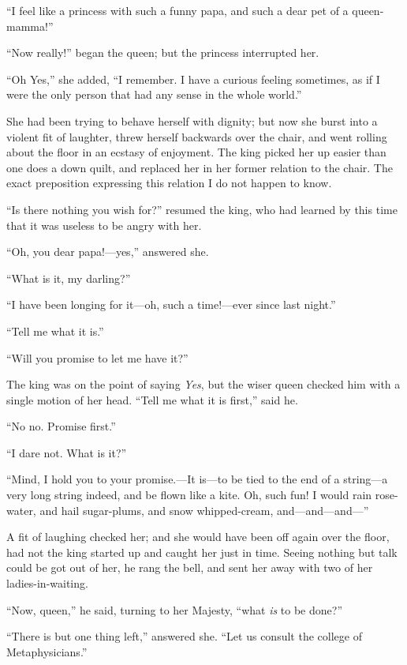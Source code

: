 \documentclass[12pt]{memoir}
\begin{document}
``I feel like a princess with such a funny papa, and such a dear pet
of a queen-mamma!''

``Now really!'' began the queen; but the princess interrupted her.

``Oh Yes,'' she added, ``I remember.  I have a curious feeling
sometimes, as if I were the only person that had any sense in the
whole world.''

She had been trying to behave herself with dignity; but now she burst
into a violent fit of laughter, threw herself backwards over the
chair, and went rolling about the floor in an ecstasy of enjoyment.
The king picked her up easier than one does a down quilt, and replaced
her in her former relation to the chair.  The exact preposition
expressing this relation I do not happen to know.

``Is there nothing you wish for?'' resumed the king, who had learned
by this time that it was useless to be angry with her.

``Oh, you dear papa!---yes,'' answered she.

``What is it, my darling?''

``I have been longing for it---oh, such a time!---ever since last
night.''

``Tell me what it is.''

``Will you promise to let me have it?''

The king was on the point of saying \emph{Yes}, but the wiser queen
checked him with a single motion of her head.  ``Tell me what it is
first,'' said he.

``No no.  Promise first.''

``I dare not.  What is it?''

``Mind, I hold you to your promise.---It is---to be tied to the end of
a string---a very long string indeed, and be flown like a kite.  Oh,
such fun!  I would rain rose-water, and hail sugar-plums, and snow
whipped-cream, and---and---and---''

A fit of laughing checked her; and she would have been off again over
the floor, had not the king started up and caught her just in time.
Seeing nothing but talk could be got out of her, he rang the bell, and
sent her away with two of her ladies-in-waiting.

``Now, queen,'' he said, turning to her Majesty, ``what \emph{is} to
be done?''

``There is but one thing left,'' answered she.  ``Let us consult the
college of Metaphysicians.''
\end{document}
